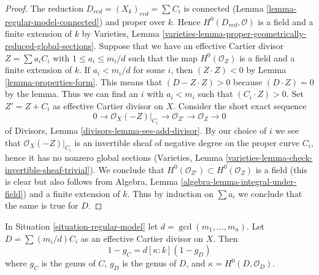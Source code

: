 \begin{proof}
The reduction $D_{red} = (X_k)_{red} = \sum C_i$ is connected
(Lemma \ref{lemma-regular-model-connected}) and proper over $k$. Hence
$H^0(D_{red}, \mathcal{O})$ is a field and a finite extension of
$k$ by Varieties, Lemma
\ref{varieties-lemma-proper-geometrically-reduced-global-sections}.
Suppose that we have an effective Cartier divisor $Z = \sum a_i C_i$
with $1 \leq a_i \leq m_i/d$ such that the map
$H^0(\mathcal{O}_Z)$ is a field and a finite extension of $k$.
If $a_i < m_i/d$ for some $i$, then $(Z \cdot Z) < 0$
by Lemma \ref{lemma-properties-form}. This means that
$(D - Z \cdot Z) > 0$ because $(D \cdot Z) = 0$ by the lemma.
Thus we can find an $i$ with $a_i < m_i$ such that
$(C_i \cdot Z) > 0$. Set $Z' = Z + C_i$ as effective Cartier divisor on $X$.
Consider the short exact sequence
$$
0 \to \mathcal{O}_X(-Z)|_{C_i} \to \mathcal{O}_{Z'} \to \mathcal{O}_Z \to 0
$$
of Divisors, Lemma \ref{divisors-lemma-ses-add-divisor}.
By our choice of $i$ we see that
$\mathcal{O}_X(-Z)|_{C_i}$ is an invertible sheaf of negative degree
on the proper curve $C_i$, hence it has no nonzero global sections
(Varieties, Lemma \ref{varieties-lemma-check-invertible-sheaf-trivial}).
We conclude that $H^0(\mathcal{O}_{Z'}) \subset H^0(\mathcal{O}_Z)$
is a field (this is clear but also follows from
Algebra, Lemma \ref{algebra-lemma-integral-under-field})
and a finite extension of $k$. Thus by induction on $\sum a_i$
we conclude that the same is true for $D$.
\end{proof}

\begin{lemma}
\label{lemma-regular-model-genus}
\begin{reference}
\cite[Lemma 2.6]{Artin-Winters}
\end{reference}
In Situation \ref{situation-regular-model} let $d = \gcd(m_1, \ldots, m_n)$.
Let $D = \sum (m_i/d) C_i$ as an effective Cartier divisor on $X$. Then
$$
1 - g_C = d [\kappa : k] (1 - g_D)
$$
where $g_C$ is the genus of $C$, $g_D$ is the genus of $D$, and
$\kappa = H^0(D, \mathcal{O}_D)$.
\end{lemma}

